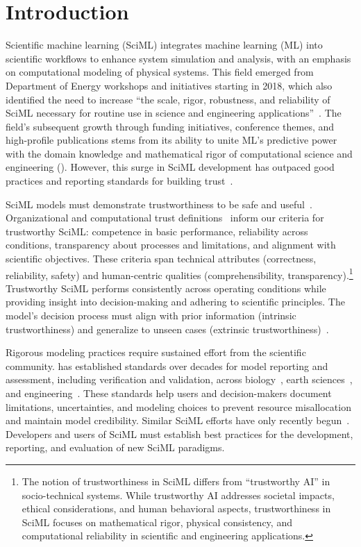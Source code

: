 \section{Introduction}
Scientific machine learning (SciML) integrates machine learning (ML) into scientific workflows to enhance system simulation and analysis, with an emphasis on computational modeling of physical systems.
This field emerged from Department of Energy workshops and initiatives starting in 2018, which also identified the need to increase ``the scale, rigor, robustness, and reliability of SciML necessary for routine use in science and engineering applications''~\cite{baker2019workshop}.
The field's subsequent growth through funding initiatives, conference themes, and high-profile publications stems from its ability to unite ML's predictive power with the domain knowledge and mathematical rigor of computational science and engineering (\CSE{}).
However, this surge in SciML development has outpaced good practices and reporting standards for building trust~\cite{Mcgreivy_H_arxiv_2024,Kapoor_et_al_SA_2024,Wang_MKetal_COM_2020,Zhu_YR_EST_2023}.

SciML models must demonstrate trustworthiness to be safe and useful~\cite{Jacovi_MMG_ACM_2021}.
Organizational and computational trust definitions~\cite{schneider1999trust,vashney2022trustworthy} inform our criteria for trustworthy SciML: competence in basic performance, reliability across conditions, transparency about processes and limitations, and alignment with scientific objectives.
These criteria span technical attributes (correctness, reliability, safety) and human-centric qualities (comprehensibility, transparency).\footnote{The notion of trustworthiness in SciML differs from ``trustworthy AI'' in socio-technical systems. While trustworthy AI addresses societal impacts, ethical considerations, and human behavioral aspects, trustworthiness in SciML focuses on mathematical rigor, physical consistency, and computational reliability in scientific and engineering applications.}
Trustworthy SciML performs consistently across operating conditions while providing insight into decision-making and adhering to scientific principles.
The model's decision process must align with prior information (intrinsic trustworthiness) and generalize to unseen cases (extrinsic trustworthiness)~\cite{Jacovi_MMG_ACM_2021}.

Rigorous modeling practices require sustained effort from the scientific community.
\CSE{} has established standards over decades for model reporting and assessment, including verification and validation, across biology~\cite{Patterson_W_CVM_1017}, earth sciences~\cite{Oreskes_SB_Science_1994, Jakeman_LN_EMS_2006}, and engineering~\cite{Schwer_EWC_2007, Roy_O_CMAME_2011, Sandkararaman_M_RESS_2015, AIAA_validation_report_1998}.
These standards help users and decision-makers document limitations, uncertainties, and modeling choices to prevent resource misallocation and maintain model credibility.
Similar SciML efforts have only recently begun~\cite{Kapoor_et_al_SA_2024,Wang_MKetal_COM_2020,Zhu_YR_EST_2023}.
Developers and users of SciML must establish best practices for the development, reporting, and evaluation of new SciML paradigms.

